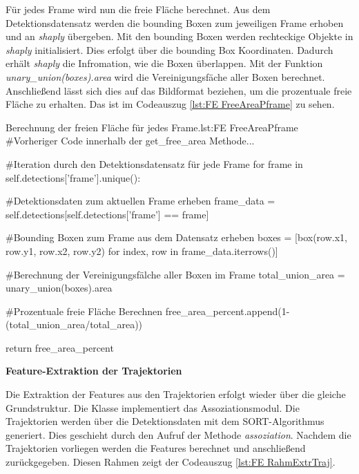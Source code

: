 Für jedes Frame wird nun die freie Fläche berechnet. Aus dem Detektionsdatensatz werden die bounding Boxen zum jeweiligen Frame erhoben und an \textit{shaply} übergeben. Mit den bounding Boxen werden rechteckige Objekte in \textit{shaply} initialisiert. Dies erfolgt über die bounding Box Koordinaten. Dadurch erhält \textit{shaply} die Infromation, wie die Boxen überlappen. Mit der Funktion \textit{unary\_union(boxes).area} wird die Vereinigungsfäche aller Boxen berechnet. Anschließend lässt sich dies auf das Bildformat beziehen, um die prozentuale freie Fläche zu erhalten. Das ist im Codeauszug \ref{lst:FE FreeAreaPframe} zu sehen. 

\begin{pythoncode}{Berechnung der freien Fläche für jedes Frame.}{lst:FE FreeAreaPframe}
#Vorheriger Code innerhalb der get_free_area Methode...

#Iteration durch den Detektionsdatensatz für jede Frame
for frame in self.detections['frame'].unique():

    #Detektionsdaten zum aktuellen Frame erheben
    frame_data = self.detections[self.detections['frame'] == frame]

    #Bounding Boxen zum Frame aus dem Datensatz erheben
    boxes = [box(row.x1, row.y1, row.x2, row.y2) for index, row in frame_data.iterrows()]
   
    #Berechnung der Vereinigungsfälche aller Boxen im Frame
    total_union_area = unary_union(boxes).area

    #Prozentuale freie Fläche Berechnen 
    free_area_percent.append(1-(total_union_area/total_area))

return free_area_percent

\end{pythoncode}


\dubpar
\textbf{Feature-Extraktion der Trajektorien}\par

Die Extraktion der Features aus den Trajektorien erfolgt wieder über die gleiche Grundstruktur. Die Klasse implementiert das Assoziationsmodul. Die Trajektorien werden über die Detektionsdaten mit dem SORT-Algorithmus generiert. Dies geschieht durch den Aufruf der Methode \textit{assoziation}. Nachdem die Trajektorien vorliegen werden die Features berechnet und anschließend zurückgegeben. Diesen Rahmen zeigt der Codeauszug \ref{lst:FE RahmExtrTraj}. 

